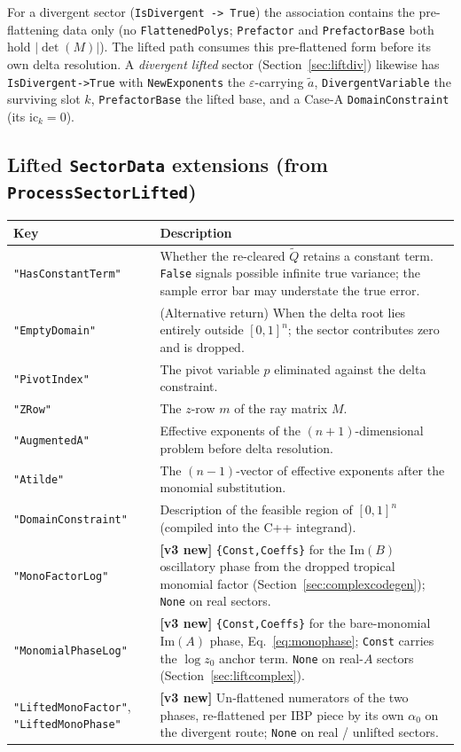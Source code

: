 \documentclass[11pt,a4paper]{article}
\begin{document}
For a divergent sector (\texttt{IsDivergent -> True}) the association contains the pre-flattening data only (no \texttt{FlattenedPolys}; \texttt{Prefactor} and \texttt{PrefactorBase} both hold $|\det(M)|$). The lifted path consumes this pre-flattened form before its own delta resolution. A \emph{divergent lifted} sector (Section~\ref{sec:liftdiv}) likewise has \texttt{IsDivergent->True} with \texttt{NewExponents} the $\varepsilon$-carrying $\tilde a$, \texttt{DivergentVariable} the surviving slot $k$, \texttt{PrefactorBase} the lifted base, and a Case-A \texttt{DomainConstraint} (its $\mathrm{ic}_k=0$).

\subsection{Lifted \texttt{SectorData} extensions (from \texttt{ProcessSectorLifted})}
\begin{center}
\begin{tabular}{lp{9cm}}
\toprule
\textbf{Key} & \textbf{Description} \\
\midrule
\texttt{"HasConstantTerm"} & Whether the re-cleared $\tilde{Q}$ retains a constant term. \texttt{False} signals possible infinite true variance; the sample error bar may understate the true error. \\
\texttt{"EmptyDomain"} & (Alternative return) When the delta root lies entirely outside $[0,1]^n$; the sector contributes zero and is dropped. \\
\texttt{"PivotIndex"} & The pivot variable $p$ eliminated against the delta constraint. \\
\texttt{"ZRow"} & The $z$-row $m$ of the ray matrix $M$. \\
\texttt{"AugmentedA"} & Effective exponents of the $(n{+}1)$-dimensional problem before delta resolution. \\
\texttt{"Atilde"} & The $(n{-}1)$-vector of effective exponents after the monomial substitution. \\
\texttt{"DomainConstraint"} & Description of the feasible region of $[0,1]^n$ (compiled into the C++ integrand). \\
\texttt{"MonoFactorLog"} & \textbf{[v3 new]} \texttt{\{Const,Coeffs\}} for the $\mathrm{Im}(B)$ oscillatory phase from the dropped tropical monomial factor (Section~\ref{sec:complexcodegen}); \texttt{None} on real sectors. \\
\texttt{"MonomialPhaseLog"} & \textbf{[v3 new]} \texttt{\{Const,Coeffs\}} for the bare-monomial $\mathrm{Im}(A)$ phase, Eq.~\eqref{eq:monophase}; \texttt{Const} carries the $\log z_0$ anchor term. \texttt{None} on real-$A$ sectors (Section~\ref{sec:liftcomplex}). \\
\texttt{"LiftedMonoFactor"}, \texttt{"LiftedMonoPhase"} & \textbf{[v3 new]} Un-flattened numerators of the two phases, re-flattened per IBP piece by its own $\alpha_0$ on the divergent route; \texttt{None} on real / unlifted sectors. \\
\bottomrule
\end{tabular}
\end{center}
\end{document}
